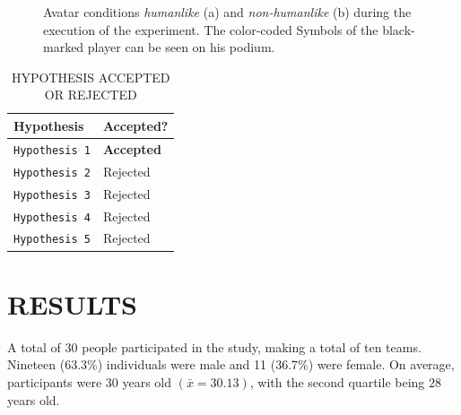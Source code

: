 \documentclass[sigchi]{acmart}
\begin{document}
\begin{figure}[H]
  \centering
  \qquad
  \caption[The avatars in the experimental environment]{Avatar conditions \textit{humanlike} (a) and \textit{non-humanlike} (b) during the execution of the experiment. The color-coded Symbols of the black-marked player can be seen on his podium.}
  \label{AvatareImEinsatz}
\end{figure}

\begin{table}
  \caption{HYPOTHESIS ACCEPTED OR REJECTED}
  \label{AcceptOrReject}
  \begin{tabular}{ll}
    \toprule
    Hypothesis & Accepted? \\
    \midrule
     \texttt{Hypothesis 1} & \textbf{Accepted} \\
     \texttt{Hypothesis 2} & Rejected \\
     \texttt{Hypothesis 3} & Rejected \\
     \texttt{Hypothesis 4} & Rejected \\
     \texttt{Hypothesis 5} & Rejected \\
    \bottomrule
  \end{tabular}
\end{table}

\section{RESULTS}
A total of 30 people participated in the study, making a total of ten teams. Nineteen (63.3\%) individuals were male and 11 (36.7\%) were female. On average, participants were 30 years old $(\bar{x} = 30.13)$, with the second quartile being $28$ years old. %
\end{document}
